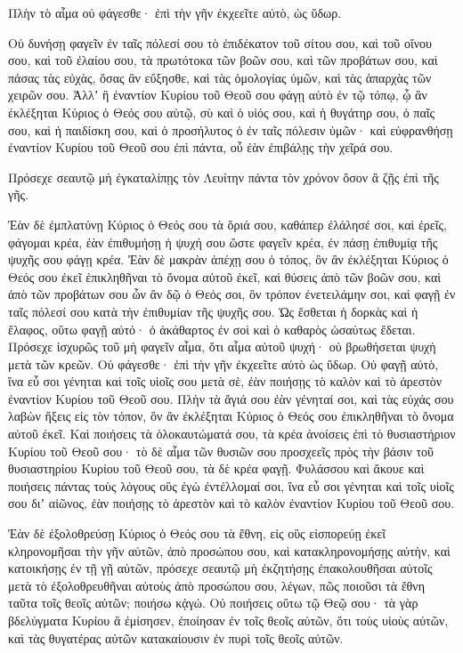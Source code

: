 {Πλὴν τὸ αἷμα οὐ φάγεσθε· ἐπὶ τὴν γῆν ἐκχεεῖτε αὐτὸ, ὡς ὕδωρ.
\par }{\PP {}Οὐ δυνήσῃ φαγεῖν ἐν ταῖς πόλεσί σου τὸ ἐπιδέκατον τοῦ σίτου σου, καὶ τοῦ οἴνου σου, καὶ τοῦ ἐλαίου σου, τὰ πρωτότοκα τῶν βοῶν σου, καὶ τῶν προβάτων σου, καὶ πάσας τὰς εὐχὰς, ὅσας ἂν εὔξησθε, καὶ τὰς ὁμολογίας ὑμῶν, καὶ τὰς ἀπαρχὰς τῶν χειρῶν σου.
Ἀλλʼ ἢ ἐναντίον Κυρίου τοῦ Θεοῦ σου φάγῃ αὐτὸ ἐν τῷ τόπῳ, ᾧ ἂν ἐκλέξηται Κύριος ὁ Θεός σου αὐτῷ, σὺ καὶ ὁ υἱός σου, καὶ ἡ θυγάτηρ σου, ὁ παῖς σου, καὶ ἡ παιδίσκη σου, καὶ ὁ προσήλυτος ὁ ἐν ταῖς πόλεσιν ὑμῶν· καὶ εὐφρανθήσῃ ἐναντίον Κυρίου τοῦ Θεοῦ σου ἐπὶ πάντα, οὗ ἐὰν ἐπιβάλῃς τὴν χεῖρά σου.
\par }{\PP {}Πρόσεχε σεαυτῷ μὴ ἐγκαταλίπῃς τὸν Λευίτην πάντα τὸν χρόνον ὅσον ἂ ζῇς ἐπὶ τῆς γῆς.
\par }{\PP {}Ἐὰν δὲ ἐμπλατύνῃ Κύριος ὁ Θεός σου τὰ ὅριά σου, καθάπερ ἐλάλησέ σοι, καὶ ἐρεῖς, φάγομαι κρέα, ἐὰν ἐπιθυμήσῃ ἡ ψυχή σου ὥστε φαγεῖν κρέα, ἐν πάσῃ ἐπιθυμίᾳ τῆς ψυχῆς σου φάγῃ κρέα.
Ἐὰν δὲ μακρὰν ἀπέχῃ σου ὁ τόπος, ὃν ἂν ἐκλέξηται Κύριος ὁ Θεός σου ἐκεῖ ἐπικληθῆναι τὸ ὄνομα αὐτοῦ ἐκεῖ, καὶ θύσεις ἀπὸ τῶν βοῶν σου, καὶ ἀπὸ τῶν προβάτων σου ὧν ἂν δῷ ὁ Θεός σοι, ὃν τρόπον ἐνετειλάμην σοι, καὶ φαγῇ ἐν ταῖς πόλεσί σου κατὰ τὴν ἐπιθυμίαν τῆς ψυχῆς σου.
Ὡς ἔσθεται ἡ δορκὰς καὶ ἡ ἔλαφος, οὕτω φαγῇ αὐτό· ὁ ἀκάθαρτος ἐν σοὶ καὶ ὁ καθαρὸς ὡσαύτως ἔδεται.
Πρόσεχε ἰσχυρῶς τοῦ μὴ φαγεῖν αἷμα, ὅτι αἷμα αὐτοῦ ψυχή· οὐ βρωθήσεται ψυχὴ μετὰ τῶν κρεῶν.
Οὐ φάγεσθε· ἐπὶ τὴν γῆν ἐκχεεῖτε αὐτὸ ὡς ὕδωρ.
Οὐ φαγῇ αὐτὸ, ἵνα εὖ σοι γένηται καὶ τοῖς υἱοῖς σου μετὰ σὲ, ἐὰν ποιήσῃς τὸ καλὸν καὶ τὸ ἀρεστὸν ἐναντίον Κυρίου τοῦ Θεοῦ σου.
Πλὴν τὰ ἅγιά σου ἐὰν γένηταί σοι, καὶ τὰς εὐχάς σου λαβὼν ἥξεις εἰς τὸν τόπον, ὃν ἂν ἐκλέξηται Κύριος ὁ Θεός σου ἐπικληθῆναι τὸ ὄνομα αὐτοῦ ἐκεῖ.
Καὶ ποιήσεις τὰ ὁλοκαυτώματά σου, τὰ κρέα ἀνοίσεις ἐπὶ τὸ θυσιαστήριον Κυρίου τοῦ Θεοῦ σου· τὸ δὲ αἷμα τῶν θυσιῶν σου προσχεεῖς πρὸς τὴν βάσιν τοῦ θυσιαστηρίου Κυρίου τοῦ Θεοῦ σου, τὰ δὲ κρέα φαγῇ.
Φυλάσσου καὶ ἄκουε καὶ ποιήσεις πάντας τοὺς λόγους οὓς ἐγὼ ἐντέλλομαί σοι, ἵνα εὖ σοι γένηται καὶ τοῖς υἱοῖς σου διʼ αἰῶνος, ἐὰν ποιήσῃς τὸ ἀρεστὸν καὶ τὸ καλὸν ἐναντίον Κυρίου τοῦ Θεοῦ σου.
\par }{\PP {}Ἐὰν δὲ ἐξολοθρεύσῃ Κύριος ὁ Θεός σου τὰ ἔθνη, εἰς οὓς εἰσπορεύῃ ἐκεῖ κληρονομῆσαι τὴν γῆν αὐτῶν, ἀπὸ προσώπου σου, καὶ κατακληρονομήσῃς αὐτὴν, καὶ κατοικήσῃς ἐν τῇ γῇ αὐτῶν,
πρόσεχε σεαυτῷ μὴ ἐκζητήσῃς ἐπακολουθῆσαι αὐτοῖς μετὰ τὸ ἐξολοθρευθῆναι αὐτοὺς ἀπὸ προσώπου σου, λέγων, πῶς ποιοῦσι τὰ ἔθνη ταῦτα τοῖς θεοῖς αὐτῶν; ποιήσω κᾀγώ.
Οὐ ποιήσεις οὕτω τῷ Θεῷ σου· τὰ γὰρ βδελύγματα Κυρίου ἃ ἐμίσησεν, ἐποίησαν ἐν τοῖς θεοῖς αὐτῶν, ὅτι τοὺς υἱοὺς αὐτῶν, καὶ τὰς θυγατέρας αὐτῶν κατακαίουσιν ἐν πυρὶ τοῖς θεοῖς αὐτῶν.

}
